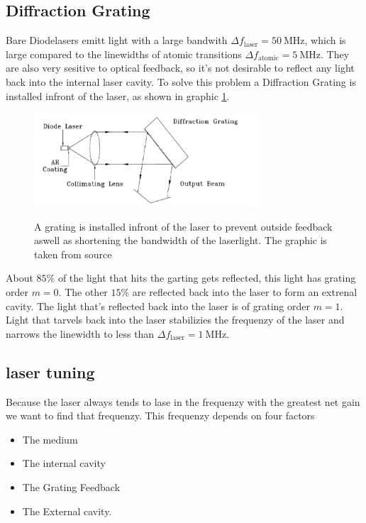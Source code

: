 \subsection{Diffraction Grating}
Bare Diodelasers emitt light with a large bandwith $\Delta f_\text{laser} = \SI{50}{\mega\Hz}$, which is large compared to the linewidths of atomic transitions $\Delta f_\text{atomic} = \SI{5}{\mega\Hz}$.
They are also very sesitive to optical feedback, so it's not desirable to reflect any light back into the internal laser cavity.
To solve this problem a Diffraction Grating is installed infront of the laser, as shown in graphic \ref{fig:grating}.

\begin{figure}
    \centering
    \caption{A grating is installed infront of the laser to prevent outside feedback aswell as shortening the bandwidth of the laserlight. The graphic is taken from source \cite[5]{anleitung_laser}}
    \includegraphics[width=0.75\textwidth]{content/data/grating}
    \label{fig:grating}
\end{figure}

About $85\%$ of the light that hits the garting gets reflected, this light has grating order $m=0$.
The other $15\%$ are reflected back into the laser to form an extrenal cavity.
The light that's reflected back into the laser is of grating order $m=1$.
Light that tarvels back into the laser stabilizies the frequenzy of the laser and narrows the linewidth to less than $\Delta f_\text{laser} = \SI{1}{\mega\Hz}$.


\subsection{laser tuning}
Because the laser always tends to lase in the frequenzy with the greatest net gain we want to find that frequenzy.
This frequenzy depends on four factors 

\begin{itemize}
    \item The medium
    \item The internal cavity
    \item The Grating Feedback
    \item The External cavity.
\end{itemize}

